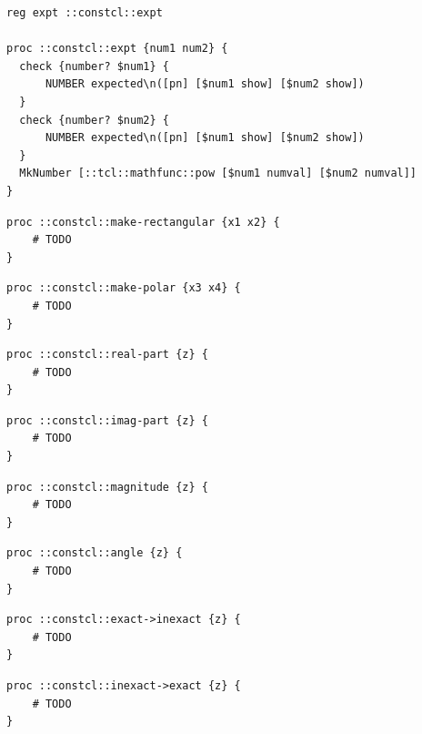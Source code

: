 \documentclass[twoside,9pt]{report}
\begin{document}
\noindent\makebox[\linewidth]{\rule{\linewidth}{0.4pt}}
\begin{lstlisting}
reg expt ::constcl::expt
 
proc ::constcl::expt {num1 num2} {
  check {number? $num1} {
      NUMBER expected\n([pn] [$num1 show] [$num2 show])
  }
  check {number? $num2} {
      NUMBER expected\n([pn] [$num1 show] [$num2 show])
  }
  MkNumber [::tcl::mathfunc::pow [$num1 numval] [$num2 numval]]
}
\end{lstlisting}
\noindent\makebox[\linewidth]{\rule{\linewidth}{0.4pt}}
\noindent\makebox[\linewidth]{\rule{\linewidth}{0.4pt}}
\begin{lstlisting}
proc ::constcl::make-rectangular {x1 x2} {
    # TODO
}
\end{lstlisting}
\noindent\makebox[\linewidth]{\rule{\linewidth}{0.4pt}}
\noindent\makebox[\linewidth]{\rule{\linewidth}{0.4pt}}
\begin{lstlisting}
proc ::constcl::make-polar {x3 x4} {
    # TODO
}
\end{lstlisting}
\noindent\makebox[\linewidth]{\rule{\linewidth}{0.4pt}}
\noindent\makebox[\linewidth]{\rule{\linewidth}{0.4pt}}
\begin{lstlisting}
proc ::constcl::real-part {z} {
    # TODO
}
\end{lstlisting}
\noindent\makebox[\linewidth]{\rule{\linewidth}{0.4pt}}
\noindent\makebox[\linewidth]{\rule{\linewidth}{0.4pt}}
\begin{lstlisting}
proc ::constcl::imag-part {z} {
    # TODO
}
\end{lstlisting}
\noindent\makebox[\linewidth]{\rule{\linewidth}{0.4pt}}
\noindent\makebox[\linewidth]{\rule{\linewidth}{0.4pt}}
\begin{lstlisting}
proc ::constcl::magnitude {z} {
    # TODO
}
\end{lstlisting}
\noindent\makebox[\linewidth]{\rule{\linewidth}{0.4pt}}
\noindent\makebox[\linewidth]{\rule{\linewidth}{0.4pt}}
\begin{lstlisting}
proc ::constcl::angle {z} {
    # TODO
}
\end{lstlisting}
\noindent\makebox[\linewidth]{\rule{\linewidth}{0.4pt}}
\noindent\makebox[\linewidth]{\rule{\linewidth}{0.4pt}}
\begin{lstlisting}
proc ::constcl::exact->inexact {z} {
    # TODO
}
\end{lstlisting}
\noindent\makebox[\linewidth]{\rule{\linewidth}{0.4pt}}
\noindent\makebox[\linewidth]{\rule{\linewidth}{0.4pt}}
\begin{lstlisting}
proc ::constcl::inexact->exact {z} {
    # TODO
}
\end{lstlisting}
\noindent\makebox[\linewidth]{\rule{\linewidth}{0.4pt}}
\end{document}
